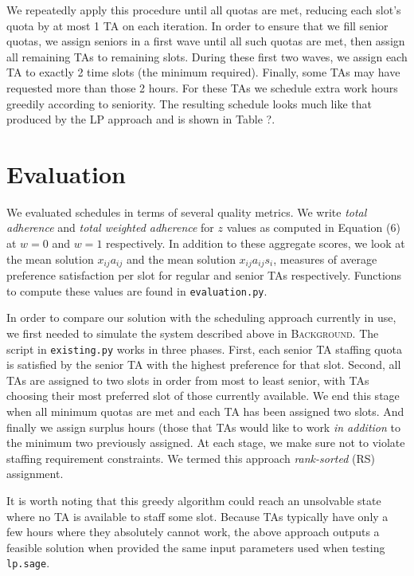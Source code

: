 \documentclass{article}
\begin{document}
\begin{multicols}{2}
We repeatedly apply this procedure until all quotas are met, reducing each slot's quota by at most 1 TA on each iteration. In order to ensure that we fill senior quotas, we assign seniors in a first wave until all such quotas are met, then assign all remaining TAs to remaining slots. During these first two waves, we assign each TA to exactly 2 time slots (the minimum required). Finally, some TAs may have requested more than those 2 hours. For these TAs we schedule extra work hours greedily according to seniority. The resulting schedule looks much like that produced by the LP approach and is shown in Table ?.

\section*{Evaluation}

We evaluated schedules in terms of several quality metrics. We write \textit{total adherence} and \textit{total weighted adherence} for $z$ values as computed in Equation (6) at $w = 0$ and $w = 1$ respectively. In addition to these aggregate scores, we look at the mean solution $x_{ij}a_{ij}$ and the mean solution $x_{ij}a_{ij}s_i$, measures of average preference satisfaction per slot for regular and senior TAs respectively. Functions to compute these values are found in \texttt{evaluation.py}.

In order to compare our solution with the scheduling approach currently in use, we first needed to simulate the system described above in \textsc{Background}. The script in \texttt{existing.py} works in three phases. First, each senior TA staffing quota is satisfied by the senior TA with the highest preference for that slot. Second, all TAs are assigned to two slots in order from most to least senior, with TAs choosing their most preferred slot of those currently available. We end this stage when all minimum quotas are met and each TA has been assigned two slots. And finally we assign surplus hours (those that TAs would like to work \textit{in addition} to the minimum two previously assigned. At each stage, we make sure not to violate staffing requirement constraints. We termed this approach \textit{rank-sorted} (RS) assignment.

It is worth noting that this greedy algorithm could reach an unsolvable state where no TA is available to staff some slot. Because TAs typically have only a few hours where they absolutely cannot work, the above approach outputs a feasible solution when provided the same input parameters used when testing \texttt{lp.sage}.


\end{multicols}
\end{document}
